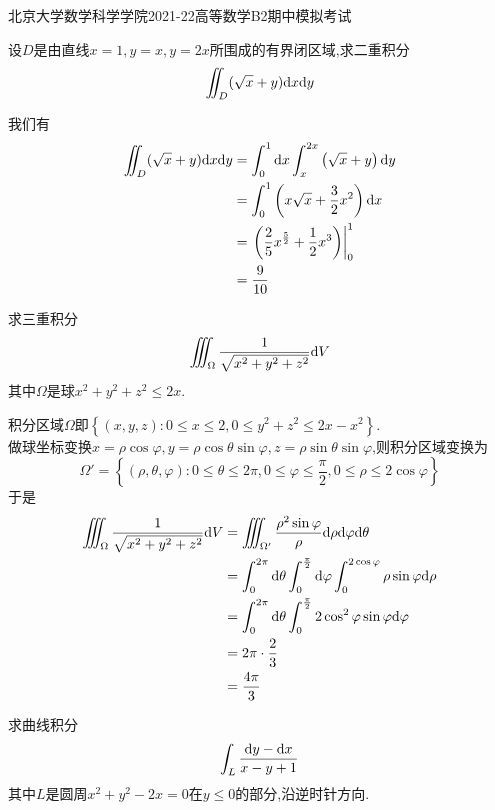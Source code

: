 \documentclass{ctexart}
\begin{document}
\pagestyle{empty}
\begin{center}\Large
    北京大学数学科学学院2021-22高等数学B2期中模拟考试
\end{center}
\begin{problem}[1.(10\songti{分})]
    设$D$是由直线$x=1,y=x,y=2x$所围成的有界闭区域,求二重积分
    \[\iint_D(\sqrt x+y)\mathrm{d} x\mathrm{d} y\]

\end{problem}
\begin{solution}
    我们有
    \[\begin{aligned}
        \iint_D(\sqrt x+y)\mathrm{d} x\mathrm{d} y
        &= \int_0^1\mathrm{d} x\int_x^{2x}\left(\sqrt x+y\right)\mathrm{d} y \\
        &= \int_0^1\left(x\sqrt x+\dfrac32x^2\right)\mathrm{d} x \\
        &= \left.\left(\dfrac25x^{\frac52}+\dfrac12x^3\right)\right|_0^1 \\
        &= \dfrac{9}{10}
    \end{aligned}\]
\end{solution}
\begin{problem}[2.(10\songti{分})]
    求三重积分
    \[\iiint_\Omega\dfrac{1}{\sqrt{x^2+y^2+z^2}}\mathrm{d} V\]
    其中$\Omega$是球$x^2+y^2+z^2\leqslant 2x$.
\end{problem}
\begin{solution}
    积分区域$\Omega$即$\left\{(x,y,z):0\leqslant x\leqslant 2,0\leqslant y^2+z^2\leqslant 2x-x^2\right\}$.\\
    做球坐标变换$x=\rho\cos\varphi,y=\rho\cos\theta\sin\varphi,z=\rho\sin\theta\sin\varphi$,则积分区域变换为
    \[\Omega'=\left\{(\rho,\theta,\varphi):0\leqslant\theta\leqslant2\pi,0\leqslant\varphi\leqslant\dfrac\pi2,0\leqslant\rho\leqslant2\cos\varphi\right\}\]
    于是
    \[\begin{aligned}
        \iiint_\Omega\dfrac{1}{\sqrt{x^2+y^2+z^2}}\mathrm{d} V
        &= \iiint_{\Omega'}\dfrac{\rho^2\sin\varphi}{\rho}\mathrm{d}\rho\mathrm{d}\varphi\mathrm{d}\theta \\
        &= \int_0^{2\pi}\mathrm{d}\theta\int_0^{\frac\pi2}\mathrm{d}\varphi\int_0^{2\cos\varphi}\rho\sin\varphi\mathrm{d}\rho \\
        &= \int_0^{2\pi}\mathrm{d}\theta\int_0^{\frac\pi2}2\cos^2\varphi\sin\varphi\mathrm{d}\varphi \\
        &= 2\pi\cdot\dfrac{2}{3} \\
        &= \dfrac{4\pi}{3}
    \end{aligned}\]
\end{solution}
\begin{problem}[3.(10\songti{分})]
    求曲线积分
    \[\int_L\dfrac{\mathrm{d} y-\mathrm{d} x}{x-y+1}\]
    其中$L$是圆周$x^2+y^2-2x=0$在$y\leqslant 0$的部分,沿逆时针方向.
\end{problem}
\end{document}

